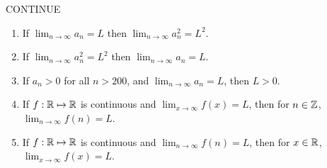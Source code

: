 \begin{Hint}
  \label{hint lim a = L lim a2 = L2}
  CONTINUE
  \begin{enumerate}
  \item 
    If $\lim_{n \to \infty} a_n = L$ then $\lim_{n \to \infty} a_n^2 = L^2$.
  \item 
    If $\lim_{n \to \infty} a_n^2 = L^2$ then $\lim_{n \to \infty} a_n = L$.
  \item 
    If $a_n > 0$ for all $n > 200$, and $\lim_{n \to \infty} a_n = L$, then $L > 0$.
  \item 
    If $f : \mathbb{R} \mapsto \mathbb{R}$ is continuous and $\lim_{x \to \infty} f(x) = L$, then for 
    $n \in \mathbb{Z}$, $\lim_{n \to \infty} f(n) = L$.
  \item 
    If $f : \mathbb{R} \mapsto \mathbb{R}$ is continuous and $\lim_{n \to \infty} f(n) = L$, then for 
    $x \in \mathbb{R}$, $\lim_{x \to \infty} f(x) = L$.
  \end{enumerate}
\end{Hint}










